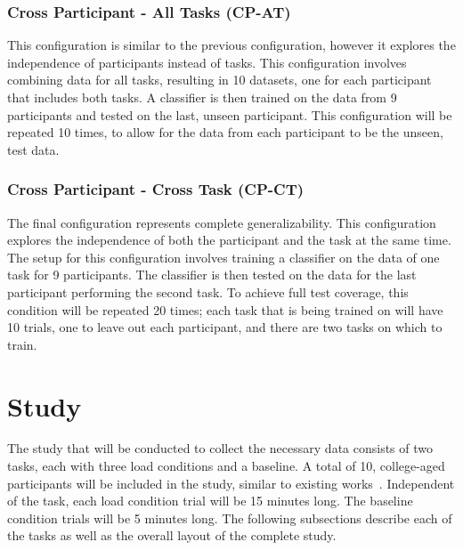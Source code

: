 \documentclass[11pt]{article}
\begin{document}
\subsubsection{Cross Participant - All Tasks (CP-AT)}
This configuration is similar to the previous configuration, however it explores the independence of participants instead of tasks. This configuration involves combining data for all tasks, resulting in 10 datasets, one for each participant that includes both tasks. A classifier is then trained on the data from 9 participants and tested on the last, unseen participant. This configuration will be repeated 10 times, to allow for the data from each participant to be the unseen, test data.

\subsubsection{Cross Participant - Cross Task (CP-CT)}
The final configuration represents complete generalizability. This configuration explores the independence of both the participant and the task at the same time. The setup for this configuration involves training a classifier on the data of one task for 9 participants. The classifier is then tested on the data for the last participant performing the second task. To achieve full test coverage, this condition will be repeated 20 times; each task that is being trained on will have 10 trials, one to leave out each participant, and there are two tasks on which to train.



\section{Study}
The study that will be conducted to collect the necessary data consists of two tasks, each with three load conditions and a baseline. A total of 10, college-aged participants will be included in the study,  similar to existing works~\cite{Ting,Wilson,Wang_R}. Independent of the task, each load condition trial will be 15 minutes long. The baseline condition trials will be 5 minutes long. The following subsections describe each of the tasks as well as the overall layout of the complete study.
\end{document}
